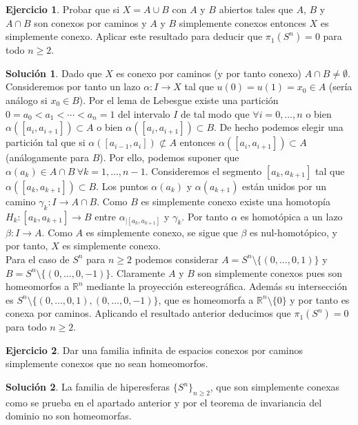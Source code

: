 \documentclass{article}
\theoremstyle{plain}
\theoremstyle{definition}
\newtheorem{exercise}{Ejercicio}
\newtheorem*{sol*}{Solución}
\newcommand{\R}{\mathbb{R}}
\begin{document}
\begin{exercise}
Probar que si $X = A\cup B$ con $A$ y $B$ abiertos tales que $A$, $B$ y $A\cap B$ son conexos por caminos
 y $A$ y $B$ simplemente conexos entonces  $X$ es simplemente conexo. Aplicar este resultado para deducir
 que $\pi_1(S^n) = 0$ para todo $n \geq 2$.
\end{exercise}
\begin{sol*}
Dado que $X$ es conexo por caminos (y por tanto conexo) $A\cap B\neq\emptyset$. Consideremos por tanto un lazo $\alpha: I\to X$ tal que $u(0)=u(1)=x_0\in A$ (sería análogo si $x_0\in B$). Por el lema de Lebesgue existe una partición $0=a_0<a_1<\cdots <a_n=1$ del intervalo $I$ de tal modo que $\forall i=0,\dots, n$ o bien $\alpha([a_i,a_{i+1}])\subset A$ o bien $\alpha([a_i,a_{i+1}])\subset B$. De hecho podemos elegir una partición tal que si $\alpha([a_{i-1},a_{i}])\not\subset A$ entonces $\alpha([a_{i},a_{i+1}])\subset A$ (análogamente para $B$). Por ello, podemos suponer que $\alpha(a_k)\in A\cap B\ \forall k=1,\dots,n-1$. Consideremos el segmento $[a_k,a_{k+1}]$ tal que $\alpha([a_k,a_{k+1}])\subset B$. Los puntos $\alpha(a_k)$ y $\alpha(a_{k+1})$ están unidos por un camino $\gamma_k: I\to A\cap B$. Como $B$ es simplemente conexo existe una homotopía $H_k:[a_k,a_{k+1}]\to B$ entre $\alpha_{\big|[a_k,a_{k+1}]}$ y $\gamma_k$. Por tanto $\alpha$ es homotópica a un lazo $\beta:I\to A$. Como $A$ es simplemente conexo, se sigue que $\beta$ es nul-homotópico, y por tanto, $X$ es simplemente conexo.\\
Para el caso de $S^n$ para $n\geq 2$ podemos considerar $A=S^n\setminus\{(0,\dots,0,1)\}$ y $B=S^n\setminus\{(0,\dots,0,-1)\}$. Claramente $A$ y $B$ son simplemente conexos pues son homeomorfos a $\R^n$ mediante la proyección estereográfica. Además su intersección es $S^n\setminus\{(0,\dots,0,1),(0,\dots,0,-1)\}$, que es homeomorfa a $\R^n\setminus\{0\}$ y por tanto es conexa por caminos. Aplicando el resultado anterior deducimos que $\pi_1(S^n) = 0$ para todo $n \geq 2$.  
\end{sol*}

\newpage 

\begin{exercise}
Dar una familia infinita de espacios conexos por caminos simplemente conexos que no sean homeomorfos.
\end{exercise}
\begin{sol*}
La familia de hiperesferas $\{S^n\}_{n\geq 2}$, que son simplemente conexas como se prueba en el apartado anterior y por el teorema de invariancia del dominio no son homeomorfas. 
\end{sol*}
\end{document}
